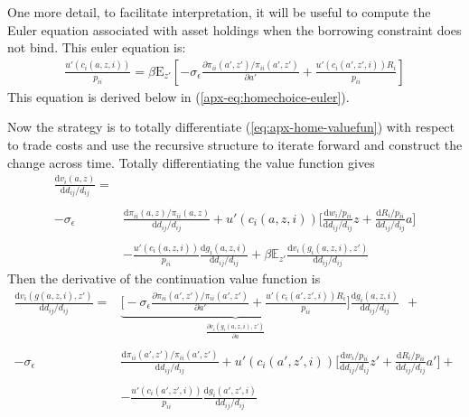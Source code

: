 \documentclass[12pt,pdftex]{article}
\begin{document}
\begin{onehalfspacing}
One more detail, to facilitate interpretation, it will be useful to compute the Euler equation associated with asset holdings when the borrowing constraint does not bind. This euler equation is:
\begin{align}
\frac{u'(c_{i}(a, z, i))}{p_{ii}} = \beta \mathrm{E}_{z'} \left[ -\sigma_{\epsilon} \frac{\partial \pi_{ii}(a',z') / \pi_{ii}(a',z')}{\partial a'} + \frac{u'(c_{i}(a', z', i))R_i}{p_{ii}} \right] \nonumber
\end{align}
This equation is derived below in (\ref{apx-eq:homechoice-euler}).

Now the strategy is to totally differentiate (\ref{eq:apx-home-valuefun}) with respect to trade costs and use the recursive structure to iterate forward and construct the change across time. Totally differentiating the value function gives
{\small
\begin{align}
\frac{\mathrm{d} v_i(a, z)}{\mathrm{d} d_{ij} / d_{ij}} =& \nonumber  \\
\nonumber \\
-\sigma_{\epsilon} & \frac{\mathrm{d} \pi_{ii}(a,z) / \pi_{ii}(a,z)}{\mathrm{d}d_{ij} / d_{ij}}  + u'(c_{i}(a,z,i)) \bigg[ \frac{\mathrm{d} w_{i} / p_{ii}}{\mathrm{d} d_{ij} / d_{ij}}z  +  \frac{\mathrm{d} R_{i} / p_{ii}}{\mathrm{d} d_{ij} / d_{ij}} a  \bigg] \\
\nonumber  \\
& - \frac{u'(c_{i}(a,z,i))}{p_{ii}}\frac{\mathrm{d} g_{i}(a,z,i)}{\mathrm{d} d_{ij} / d_{ij}} + \beta \mathbb{E}_{z'} \frac{\mathrm{d} v_i(g_{i}(a,z,i), z')}{\mathrm{d} d_{ij} / d_{ij}}
\end{align}
}
Then the derivative of the continuation value function is
{\small
\begin{align}
\frac{\mathrm{d} v_i(g(a,z,i), z')}{\mathrm{d} d_{ij} / d_{ij}} = &  \underbrace{\bigg [-\sigma_{\epsilon} \frac{\partial \pi_{ii}(a',z') / \pi_{ii}(a',z')}{\partial a'} + \frac{u'(c_{i}(a',z',i))R_{i}}{p_{ii}} \bigg ]}_{\frac{\partial v_i(g_{i}(a,z,i), z')}{\partial a}}\frac{\mathrm{d} g_{i}(a,z,i)}{\mathrm{d} d_{ij} / d_{ij}} \ \ + \\
\nonumber \\
-\sigma_{\epsilon} & \frac{\mathrm{d} \pi_{ii}(a',z') / \pi_{ii}(a',z')}{\mathrm{d}d_{ij} / d_{ij}}  + u'(c_{i}(a',z',i)) \bigg[ \frac{\mathrm{d} w_{i} / p_{ii}}{\mathrm{d} d_{ij} / d_{ij}}z'  +  \frac{\mathrm{d} R_{i} / p_{ii}}{\mathrm{d} d_{ij} / d_{ij}} a'  \bigg] + \\
\nonumber \\
& - \frac{u'(c_{i}(a',z',i))}{p_{ii}}\frac{\mathrm{d} g_{i}(a',z',i)}{\mathrm{d} d_{ij} / d_{ij}}

\end{align}}
\end{onehalfspacing}
\end{document}
